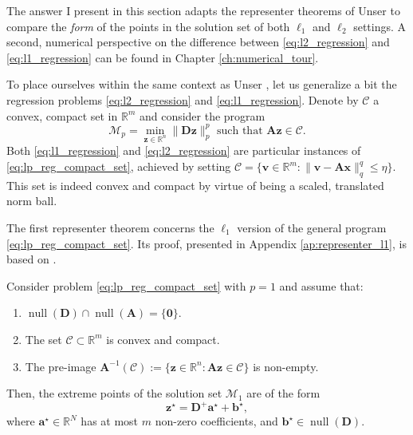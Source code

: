 The answer I present in this section adapts the representer theorems of Unser \etal \cite{unser2016,unser2016a} to compare the \emph{form} of the points in the solution set of both $\ell_1$ and $\ell_2$ settings. A second, numerical perspective on the difference between \eqref{eq:l2_regression} and \eqref{eq:l1_regression} can be found in Chapter \ref{ch:numerical_tour}.

To place ourselves within the same context as Unser \etal, let us generalize a bit the regression problems \eqref{eq:l2_regression} and \eqref{eq:l1_regression}. Denote by $\mathcal{C}$ a convex, compact set in $\mathbb{R}^{m}$ and consider the program
\begin{equation}
    \mathcal{M}_p = \underset{\mathbf{z} \in \mathbb{R}^{n}}{\min} \| \mathbf{D z} \|_p^p \text{ such that } \mathbf{Az} \in \mathcal{C}. \label{eq:lp_reg_compact_set}
\end{equation}
Both \eqref{eq:l1_regression} and \eqref{eq:l2_regression} are particular instances of \eqref{eq:lp_reg_compact_set}, achieved by setting $\mathcal{C} = \{\mathbf{v} \in \mathbb{R}^{m} : \| \mathbf{v - Ax} \|_q^q \leq \eta\}$. This set is indeed convex and compact by virtue of being a scaled, translated norm ball.

The first representer theorem concerns the $\ell_1$ version of the general program \eqref{eq:lp_reg_compact_set}. Its proof, presented in Appendix \ref{ap:representer_l1}, is based on \cite[Theorem 19]{unser2016}.

\begin{theorem}\label{thm:l1_representer}
    Consider problem \eqref{eq:lp_reg_compact_set} with $p=1$ and assume that:
    \begin{enumerate}
        \item $\operatorname{null} \left ( \mathbf{D} \right ) \cap \operatorname{null} \left ( \mathbf{A} \right ) = \{ \mathbf{0} \}$.
        \item \label{ass:compact_convex} The set $\mathcal{C} \subset \mathbb{R}^{m}$ is convex and compact.
        \item \label{ass:feasible} The pre-image $\mathbf{A}^{-1}(\mathcal{C}) := \{\mathbf{z} \in \mathbb{R}^{n}: \mathbf{Az} \in \mathcal{C}\}$ is non-empty.
    \end{enumerate}
    Then, the extreme points of the solution set $\mathcal{M}_1$ are of the form
    \begin{equation}
        \mathbf{z}^\star = \mathbf{D}^+ \mathbf{a}^\star + \mathbf{b}^\star,
    \end{equation}
    where $\mathbf{a}^\star \in \mathbb{R}^{N}$ has at most $m$ non-zero coefficients, and $\mathbf{b}^\star \in \operatorname{null} \left ( \mathbf{D} \right )$.
\end{theorem}

